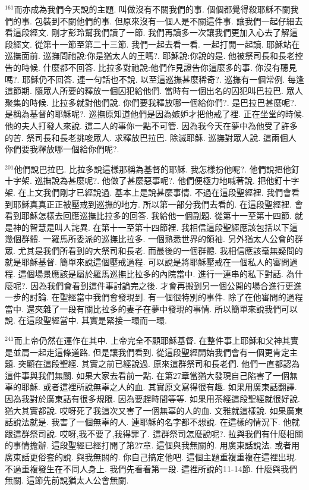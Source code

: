 \documentclass{book}
\begin{document}
$^{161}$而亦成為我們今天說的主題.
叫做沒有不關我們的事.
個個都覺得殺耶穌不關我們的事.
包裝到不關他們的事.
但原來沒有一個人是不關這件事.
讓我們一起仔細去看這段經文.
剛才彭玲幫我們讀了一節.
我們再讀多一次讓我們更加入心去了解這段經文.
從第十一節至第二十三節.
我們一起去看一看.
一起打開一起讀.
耶穌站在巡撫面前.
巡撫問祂說:你是猶太人的王嗎?.
耶穌說:你說的是.
他被祭司長和長老控告的時候.
什麼都不回答.
比拉多對祂說:他們作見證告你這麼多的事.
你沒有聽見嗎?.
耶穌仍不回答.
連一句話也不說.
以至這巡撫甚麼稀奇?.
巡撫有一個常例.
每逢這節期.
隨眾人所要的釋放一個囚犯給他們.
當時有一個出名的囚犯叫巴拉巴.
眾人聚集的時候.
比拉多就對他們說.
你們要我釋放哪一個給你們?.
是巴拉巴甚麼呢?.
是稱為基督的耶穌呢?.
巡撫原知道他們是因為嫉妒才把他戒了裡.
正在坐堂的時候.
他的夫人打發人來說.
這二人的事你一點不可管.
因為我今天在夢中為他受了許多的苦.
祭司長和長老挑唆眾人.
求釋放巴拉巴.
除滅耶穌.
巡撫對眾人說.
這兩個人你們要我釋放哪一個給你們呢?.

$^{201}$他們說巴拉巴.
比拉多說這樣那稱為基督的耶穌.
我怎樣扮他呢?.
他們說把他釘十字架.
巡撫說為甚麼呢?.
他做了甚麼惡事呢?.
他們便極力地喊著說.
把他釘十字架.
在上文我們剛才已經說過.
基本上是說甚麼事情.
不過在這段聖經裡.
我們會看到耶穌真真正正被壓戒到巡撫的地方.
所以第一部分我們去看的.
在這段聖經裡.
會看到耶穌怎樣去回應巡撫比拉多的回答.
我給他一個副題.
從第十一至第十四節.
就是神的智慧是叫人詫異.
在第十一至第十四節裡.
我相信這段聖經應該包括以下這幾個群體.
一羅馬所委派的巡撫比拉多.
一個熟悉世界的領袖.
另外猶太人公會的群眾.
尤其是我們所看到的大祭司和長老.
而最後的一個群體.
我相信應該毫無疑問的就是耶穌基督.
簡單來說這個壓戒過程.
可以說是將耶穌壓戒在一個私人的審問過程.
這個場景應該是屬於羅馬巡撫比拉多的內院當中.
進行一連串的私下對話.
為什麼呢?.
因為我們會看到這件事討論完之後.
才會再搬到另一個公開的場合進行更進一步的討論.
在聖經當中我們會發現到.
有一個很特別的事件.
除了在他審問的過程當中.
還夾雜了一段有關比拉多的妻子在夢中發現的事情.
所以簡單來說我們可以說.
在這段聖經當中.
其實是緊接一環而一環.

$^{241}$而上帝仍然在運作在其中.
上帝完全不顧耶穌基督.
在整件事上耶穌和父神其實是並肩一起走這條道路.
但是讓我們看到.
從這段聖經開始我們會有一個更肯定主題.
突顯在這段聖經.
其實之前已經說過.
原來這群祭司和長老們.
他們一直都認為這件事與我們無關.
如果大家去看前一點.
在第27章當猶大發現自己陷害了一個無辜的耶穌.
或者這裡所說無辜之人的血.
其實原文寫得很有趣.
如果用廣東話翻譯.
因為我對於廣東話有很多規限.
因為要趕時間等等.
如果用茶經這段聖經就很好說.
猶大其實都說.
哎呀死了我這次又害了一個無辜的人的血.
文雅就這樣說.
如果廣東話說法就是.
我害了一個無辜的人.
連耶穌的名字都不想說.
在這樣的情況下.
他就跟這群祭司說.
哎呀,我不要了,我得罪了.
這群祭司怎麼說呢?.
拉與我們有什麼相關的事情擔辦.
這段聖經已經打開了第27章.
這個與我無關的.
用廣東話說法.
或者用廣東話更俗套的說.
與我無關的.
你自己搞定他吧.
這個主題重複重複在這裡出現.
不過重複發生在不同人身上.
我們先看看第一段.
這裡所說的11-14節.
什麼與我們無關.
這節先前說猶太人公會無關.
\end{document}
